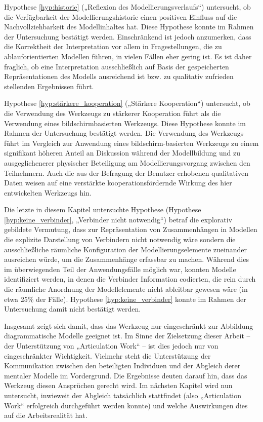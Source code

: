 Hypothese \ref{hyp:historie} („Reflexion des Modellierungsverlaufs“) untersucht, ob die Verfügbarkeit der Modellierungshistorie einen positiven Einfluss auf die Nachvollziehbarkeit des Modellinhaltes hat. Diese Hypothese konnte im Rahmen der Untersuchung bestätigt werden. Einschränkend ist jedoch anzumerken, dass die Korrektheit der Interpretation vor allem in Fragestellungen, die zu ablauforientierten Modellen führen, in vielen Fällen eher gering ist. Es ist daher fraglich, ob eine Interpretation ausschließlich auf Basis der gespeicherten Repräsentationen des Modells ausreichend ist bzw. zu qualitativ zufrieden stellenden Ergebnissen führt.

\todo Hypothese \ref{hyp:stärkere_kooperation} („Stärkere Kooperation“) untersucht, ob die Verwendung des Werkzeugs zu stärkerer Kooperation führt als die Verwendung eines bildschirmbasierten Werkzeugs. Diese Hypothese konnte im Rahmen der Untersuchung bestätigt werden. Die Verwendung des Werkzeugs führt im Vergleich zur Anwendung eines bildschirm-basierten Werkzeugs zu einem signifikant höheren Anteil an Diskussion während der Modellbildung und zu ausgeglichenerer physischer Beteiligung am Modellierungsvorgang zwischen den Teilnehmern. Auch die aus der Befragung der Benutzer erhobenen qualitativen Daten weisen auf eine verstärkte kooperationsfördernde Wirkung des hier entwickelten Werkzeugs hin.

Die letzte in diesem Kapitel untersuchte Hypothese (Hypothese \ref{hyp:keine_verbinder}, „Verbinder nicht notwendig“) betraf die explorativ gebildete Vermutung, dass zur Repräsentation von Zusammenhängen in Modellen die explizite Darstellung von Verbindern nicht notwendig wäre sondern die ausschließliche räumliche Konfiguration der Modellierungselemente zueinander ausreichen würde, um die Zusammenhänge erfassbar zu machen. Während dies im überwiegenden Teil der Anwendungsfälle möglich war, konnten Modelle identifiziert werden, in denen die Verbinder Information codierten, die rein durch die räumliche Anordnung der Modellelemente nicht ableitbar gewesen wäre (in etwa 25\% der Fälle). Hypothese \ref{hyp:keine_verbinder} konnte im Rahmen der Untersuchung damit nicht bestätigt werden.

Insgesamt zeigt sich damit, dass das Werkzeug nur eingeschränkt zur Abbildung diagrammatische Modelle geeignet ist. Im Sinne der Zielsetzung dieser Arbeit -- der Unterstützung von „Articulation Work“ -- ist dies jedoch nur von eingeschränkter Wichtigkeit. Vielmehr steht die Unterstützung der Kommunikation zwischen den beteiligten Individuen und der Abgleich derer mentaler Modelle im Vordergrund. Die Ergebnisse deuten darauf hin, dass das Werkzeug diesen Ansprüchen gerecht wird. Im nächsten Kapitel wird nun untersucht, inwieweit der Abgleich tatsächlich stattfindet (also „Articulation Work“ erfolgreich durchgeführt werden konnte) und welche Auswirkungen dies auf die Arbeitsrealität hat.

